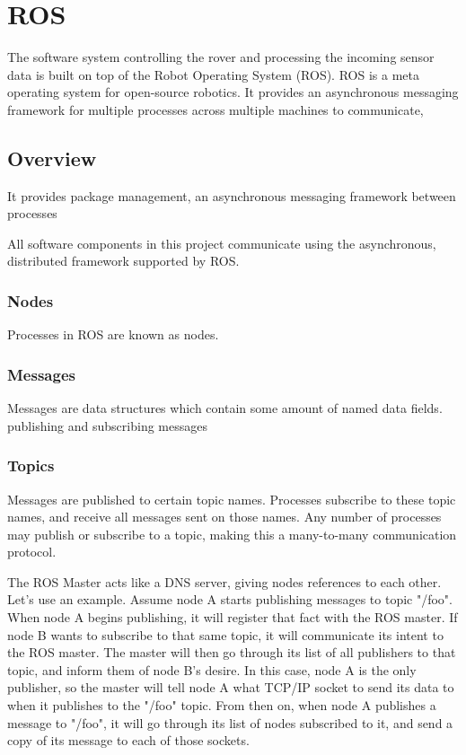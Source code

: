 \chapter{ROS}

The software system controlling the rover and processing the incoming sensor data is built on top of the Robot Operating System (ROS). ROS is a meta operating system for open-source robotics. It provides an asynchronous messaging framework for multiple processes across multiple machines to communicate, 

\section{Overview}


It provides package management, an asynchronous messaging framework between processes

All software components in this project communicate using the asynchronous, distributed framework supported by ROS.

\subsection{Nodes}
Processes in ROS are known as nodes.

\subsection{Messages}
Messages are data structures which contain some amount of named data fields.
publishing and subscribing messages

\subsection{Topics}
Messages are published to certain topic names. Processes subscribe to these topic names, and receive all messages sent on those names. Any number of processes may publish or subscribe to a topic, making this a many-to-many communication protocol.

The ROS Master acts like a DNS server, giving nodes references to each other. Let's use an example. Assume node A starts publishing messages to topic "/foo". When node A begins publishing, it will register that fact with the ROS master. If node B wants to subscribe to that same topic, it will communicate its intent to the ROS master. The master will then go through its list of all publishers to that topic, and inform them of node B's desire. In this case, node A is the only publisher, so the master will tell node A what TCP/IP socket to send its data to when it publishes to the "/foo" topic. From then on, when node A publishes a message to "/foo", it will go through its list of nodes subscribed to it, and send a copy of its message to each of those sockets.

